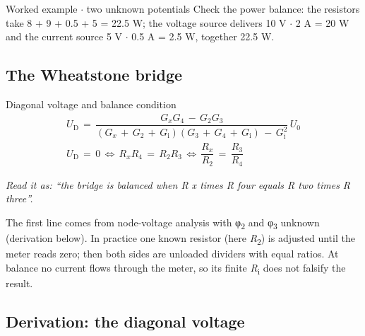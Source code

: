 \documentclass[11pt]{article}
\begin{document}
\begin{keepsection}
\begin{keepsection}
\begin{workedbox}{Worked example \ensuremath{\cdot} two unknown potentials}
Check the power balance: the resistors take 8 + 9 + 0.5 + 5 = 22.5 W; the voltage source delivers 10 V \ensuremath{\cdot} 2 A = 20 W and the current source 5 V \ensuremath{\cdot} 0.5 A = 2.5 W, together 22.5 W.
\end{workedbox}
\end{keepsection}

\begin{keepsection}
\subsection{The Wheatstone bridge}

\begin{equationcard}{Diagonal voltage and balance condition}
\[ \begin{gathered} {U}_{\mathrm{D}}\, =\, \dfrac{{G}_{{x}}{G}_{4}\, -\, {G}_{2}{G}_{3}}{({G}_{{x}}\, +\, {G}_{2}\, +\, {G}_{\mathrm{i}})({G}_{3}\, +\, {G}_{4}\, +\, {G}_{\mathrm{i}})\, -\, {G}_{\mathrm{i}}^{2}}\, {U}_{0} \\ {U}_{\mathrm{D}}\, =\, 0\, \Leftrightarrow \, {R}_{{x}}{R}_{4}\, =\, {R}_{2}{R}_{3}\, \Leftrightarrow \, \dfrac{{R}_{{x}}}{{R}_{2}}\, =\, \dfrac{{R}_{3}}{{R}_{4}} \end{gathered} \]
{\small \emph{Read it as: “the bridge is balanced when R x times R four equals R two times R three”.}\par The first line comes from node-voltage analysis with φ\textsubscript{2} and φ\textsubscript{3} unknown (derivation below). In practice one known resistor (here \textit{R}\textsubscript{2}) is adjusted until the meter reads zero; then both sides are unloaded dividers with equal ratios. At balance no current flows through the meter, so its finite \textit{R}\textsubscript{i} does not falsify the result.}
\end{equationcard}
\end{keepsection}

\begin{keepsection}
\subsection{Derivation: the diagonal voltage}


\end{keepsection}
\end{keepsection}
\end{document}
